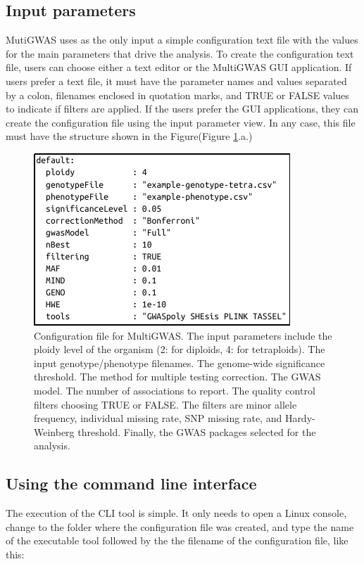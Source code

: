 \documentclass{article}
\begin{document}

\subsection{Input parameters}

MutiGWAS uses as the only input a simple configuration text file with the values for the main parameters that drive the analysis. To create the configuration text file, users can choose either a text editor or the MultiGWAS GUI application.  If users prefer a text file, it must have the parameter names and values separated by a colon, filenames enclosed in quotation marks, and TRUE or FALSE values to indicate if filters are applied. If the users prefer the GUI applications, they can create the configuration file using the input parameter view. In any case, this file must have the structure shown in the Figure(Figure \ref{fig:Configuration-file}.a.)

\begin{figure}[H]
\begin{centering}
\includegraphics{images/paper-config-file}
\par\end{centering}
\caption{Configuration file for MultiGWAS. The input parameters include the ploidy level of the organism (2: for diploids, 4: for tetraploids). The input genotype/phenotype filenames. The genome-wide significance threshold. The method for multiple testing correction. The GWAS model. The number of associations to report. The quality control filters choosing TRUE or FALSE. The filters are minor allele frequency, individual missing rate, SNP missing rate, and Hardy-Weinberg threshold. Finally, the GWAS packages selected for the analysis.
\label{fig:Configuration-file}}
\end{figure}

\subsection{Using the command line interface}
The execution of the CLI tool is simple. It only needs to open a Linux console, change to the folder where the configuration file was created, and type the name of the executable tool followed by the the filename of the configuration file, like this:
\end{document}
